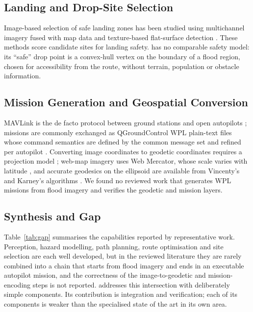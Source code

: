 \subsection{Landing and Drop-Site Selection}
Image-based selection of safe landing zones has been studied using multichannel imagery fused with map data \cite{patterson2014timely} and texture-based flat-surface detection \cite{kaljahi2019automatic}. These methods score candidate sites for landing safety. \adapt{} has no comparable safety model: its ``safe'' drop point is a convex-hull vertex on the boundary of a flood region, chosen for accessibility from the route, without terrain, population or obstacle information.

\subsection{Mission Generation and Geospatial Conversion}
MAVLink is the de facto protocol between ground stations and open autopilots \cite{meier2012pixhawk,koubaa2019micro}; missions are commonly exchanged as QGroundControl WPL plain-text files \cite{mavlink_fileformat} whose command semantics are defined by the common message set \cite{mavlink_common} and refined per autopilot \cite{ardupilot_missioncmds,px4_missions}. Converting image coordinates to geodetic coordinates requires a projection model \cite{snyder1987map}; web-map imagery uses Web Mercator, whose scale varies with latitude \cite{battersby2014implications}, and accurate geodesics on the ellipsoid are available from Vincenty's and Karney's algorithms \cite{vincenty1975direct,karney2013algorithms}. We found no reviewed work that generates WPL missions from flood imagery and verifies the geodetic and mission layers.

\subsection{Synthesis and Gap}
Table~\ref{tab:gap} summarises the capabilities reported by representative work. Perception, hazard modelling, path planning, route optimisation and site selection are each well developed, but in the reviewed literature they are rarely combined into a chain that starts from flood imagery and ends in an executable autopilot mission, and the correctness of the image-to-geodetic and mission-encoding steps is not reported. \adapt{} addresses this intersection with deliberately simple components. Its contribution is integration and verification; each of its components is weaker than the specialised state of the art in its own area.

